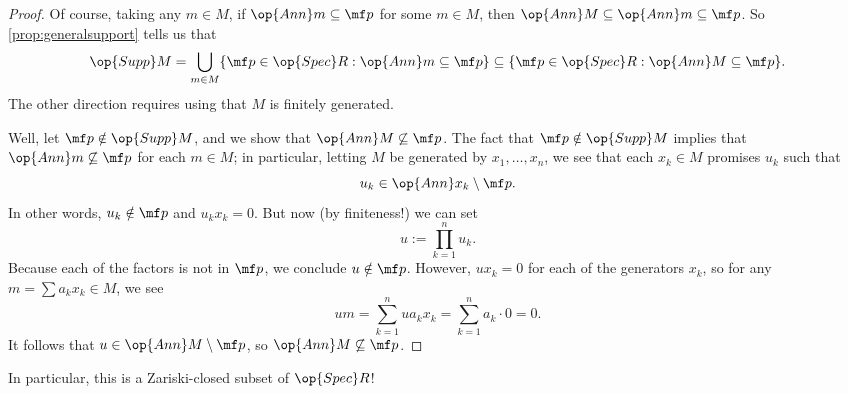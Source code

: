 \begin{proof}
	Of course, taking any $m\in M$, if $\op{Ann}m\subseteq\mf p$ for some $m\in M$, then $\op{Ann}M\subseteq\op{Ann}m\subseteq\mf p$. So \autoref{prop:generalsupport} tells us that
	\[\op{Supp}M=\bigcup_{m\in M}\{\mf p\in\op{Spec}R:\op{Ann}m\subseteq\mf p\}\subseteq\{\mf p\in\op{Spec}R:\op{Ann}M\subseteq\mf p\}.\]
	The other direction requires using that $M$ is finitely generated.

	Well, let $\mf p\notin\op{Supp}M$, and we show that $\op{Ann}M\not\subseteq\mf p$. The fact that $\mf p\notin\op{Supp}M$ implies that $\op{Ann}m\not\subseteq\mf p$ for each $m\in M$; in particular, letting $M$ be generated by $x_1,\ldots,x_n$, we see that each $x_k\in M$ promises $u_k$ such that
	\[u_k\in\op{Ann}x_k\setminus\mf p.\]
	In other words, $u_k\notin\mf p$ and $u_kx_k=0$. But now (by finiteness!) we can set
	\[u:=\prod_{k=1}^nu_k.\]
	Because each of the factors is not in $\mf p$, we conclude $u\notin\mf p$. However, $ux_k=0$ for each of the generators $x_k$, so for any $m=\sum a_kx_k\in M$, we see
	\[um=\sum_{k=1}^nua_kx_k=\sum_{k=1}^na_k\cdot0=0.\]
	It follows that $u\in\op{Ann}M\setminus\mf p$, so $\op{Ann}M\not\subseteq\mf p$.
\end{proof}
In particular, this is a Zariski-closed subset of $\op{Spec}R$!

